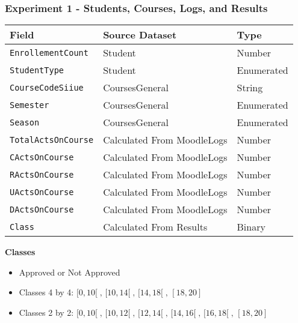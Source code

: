 \begin{frame}
\frametitle{Experiment 1 - Students, Courses, Logs, and Results}

{

\small
\centering

\begin{tabular}{| l | l | l |}
    \hline
    \textbf{Field}             & \textbf{Source Dataset}    & \textbf{Type} \\ \hline
    \texttt{EnrollementCount}  & Student                    & Number        \\ \hline
    \texttt{StudentType}       & Student                    & Enumerated    \\ \hline
    \texttt{CourseCodeSiiue}   & CoursesGeneral             & String        \\ \hline
    \texttt{Semester}          & CoursesGeneral             & Enumerated    \\ \hline
    \texttt{Season}            & CoursesGeneral             & Enumerated    \\ \hline
    \texttt{TotalActsOnCourse} & Calculated From MoodleLogs & Number        \\ \hline
    \texttt{CActsOnCourse}     & Calculated From MoodleLogs & Number        \\ \hline
    \texttt{RActsOnCourse}     & Calculated From MoodleLogs & Number        \\ \hline
    \texttt{UActsOnCourse}     & Calculated From MoodleLogs & Number        \\ \hline
    \texttt{DActsOnCourse}     & Calculated From MoodleLogs & Number        \\ \hline
    \texttt{Class}             & Calculated From Results    & Binary        \\ \hline
\end{tabular}

}

\vspace{0.5cm}

\textbf{Classes}

\begin{itemize}
    \item Approved or Not Approved
    \item Classes 4 by 4: \( [0, 10[\;,\, [10, 14[\;,\, [14, 18[\;,\, [18, 20] \)
    \item Classes 2 by 2: \( [0, 10[\;,\, [10, 12[\;,\, [12, 14[\;,\, [14, 16[\;,\, [16, 18[\;,\, [18, 20] \)
\end{itemize}

\end{frame}


